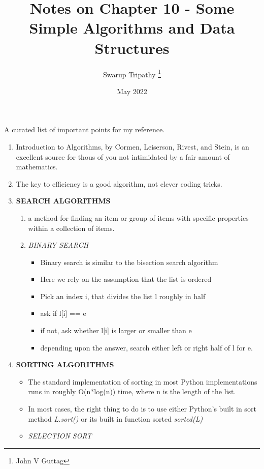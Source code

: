 \documentclass[11pt]{article}
\title{Notes on Chapter 10 - Some Simple Algorithms and Data Structures}
\author{Swarup Tripathy \thanks{John V Guttag}}
\date{May 2022}
\begin{document}
    \maketitle
    A curated list of important points for my reference.\\
    \begin{enumerate}
        \item Introduction to Algorithms, by Cormen, Leiserson, Rivest, and Stein, is an excellent source for thous of you not intimidated by a fair amount of mathematics.
        \item The key to efficiency is a good algorithm, not clever coding tricks.
        \item \textbf{SEARCH ALGORITHMS}
        \begin{enumerate}
            \item a method for finding an item or group of items with specific properties within a collection of items.
            \item \textit{BINARY SEARCH}
            \begin{itemize}
                \item Binary search is similar to the bisection search algorithm
                \item Here we rely on the assumption that the list is ordered
                \item Pick an index i, that divides the list l roughly in half
                \item ask if l[i] == e
                \item if not, ask whether l[i] is larger or smaller than e
                \item depending upon the answer, search either left or right half of l for e.
            \end{itemize}
        \end{enumerate}
        \item \textbf{SORTING ALGORITHMS}
        \begin{itemize}
            \item The standard implementation of sorting in most Python implementations runs in roughly O(n*log(n)) time, where n is the length of the list. 
            \item In most cases, the right thing to do is to use either Python's built in sort method \textit{L.sort()} or its built in function sorted \textit{sorted(L)}
            \item \textit{SELECTION SORT}
            \begin{itemize}

\end{itemize}
\end{itemize}
\end{enumerate}
\end{document}
